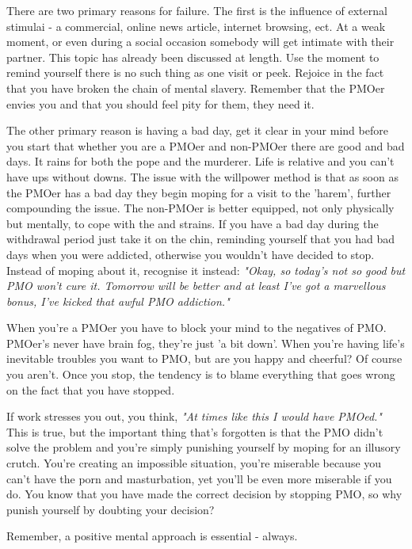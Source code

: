\documentclass[easypeasy.tex]{subfiles}
\begin{document}
There are two primary reasons for failure. The first is the influence of external stimulai - a commercial, online news article, internet browsing, ect. At a weak moment, or even during a social occasion somebody will get intimate with their partner. This topic has already been discussed at length. Use the moment to remind yourself there is no such thing as one visit or peek. Rejoice in the fact that you have broken the chain of mental slavery. Remember that the PMOer envies you and that you should feel pity for them, they need it.

The other primary reason is having a bad day, get it clear in your mind before you start that whether you are a PMOer and non-PMOer there are good and bad days. It rains for both the pope and the murderer. Life is relative and you can't have ups without downs. The issue with the willpower method is that as soon as the PMOer has a bad day they begin moping for a visit to the 'harem', further compounding the issue. The non-PMOer is better equipped, not only physically but mentally, to cope with the and strains. If you have a bad day during the withdrawal period just take it on the chin, reminding yourself that you had bad days when you were addicted, otherwise you wouldn't have decided to stop. Instead of moping about it, recognise it instead: \textit{"Okay, so today's not so good but PMO won't cure it. Tomorrow will be better and at least I've got a marvellous bonus, I've kicked that awful PMO addiction."}

When you're a PMOer you have to block your mind to the negatives of PMO. PMOer's never have brain fog, they're just 'a bit down'. When you're having life's inevitable troubles you want to PMO, but are you happy and cheerful? Of course you aren't. Once you stop, the tendency is to blame everything that goes wrong on the fact that you have stopped.

If work stresses you out, you think, \textit{"At times like this I would have PMOed."} This is true, but the important thing that's forgotten is that the PMO didn't solve the problem and you're simply punishing yourself by moping for an illusory crutch. You're creating an impossible situation, you're miserable because you can't have the porn and masturbation, yet you'll be even more miserable if you do. You know that you have made the correct decision by stopping PMO, so why punish yourself by doubting your decision?

{\huge Remember, a positive mental approach is essential - always.}
\end{document}
